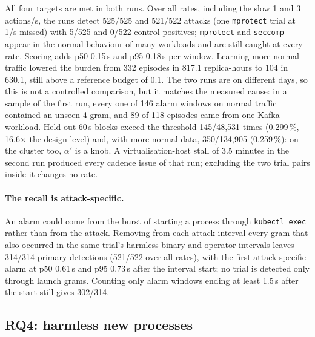 All four targets are met in both runs. Over all rates, including the slow 1 and 3 actions/s, the runs detect 525/525
and 521/522 attacks (one \texttt{mprotect} trial at 1/s missed) with 5/525 and 0/522 control positives;
\texttt{mprotect} and \texttt{seccomp} appear in the normal behaviour of many workloads and are still caught at every
rate. Scoring adds p50 0.15\,s and p95 0.18\,s per window. Learning more normal traffic lowered the burden from 332
episodes in 817.1 replica-hours to 104 in 630.1, still above a reference budget of 0.1. The two runs are on different
days, so this is not a controlled comparison, but it matches the measured cause: in a sample of the first run, every one
of 146 alarm windows on normal traffic contained an unseen 4-gram, and 89 of 118 episodes came from one Kafka workload.
Held-out 60\,s blocks exceed the threshold 145/48{,}531 times (0.299\,\%, 16.6$\times$ the design level) and, with
more normal data, 350/134{,}905 (0.259\,\%): on the cluster too, $\alpha'$ is a knob. A virtualisation-host stall of
3.5 minutes in the second run produced every cadence issue of that run; excluding the two trial pairs inside it changes
no rate.

\paragraph{The recall is attack-specific.} An alarm could come from the burst of starting a process through
\texttt{kubectl exec} rather than from the attack. Removing from each attack interval every gram that also occurred in
the same trial's harmless-binary and operator intervals leaves 314/314 primary detections (521/522 over all rates), with
the first attack-specific alarm at p50 0.61\,s and p95 0.73\,s after the interval start; no trial is detected only
through launch grams. Counting only alarm windows ending at least 1.5\,s after the start still gives 302/314.

\subsection{RQ4: harmless new processes}\label{sec:eval-benign}


